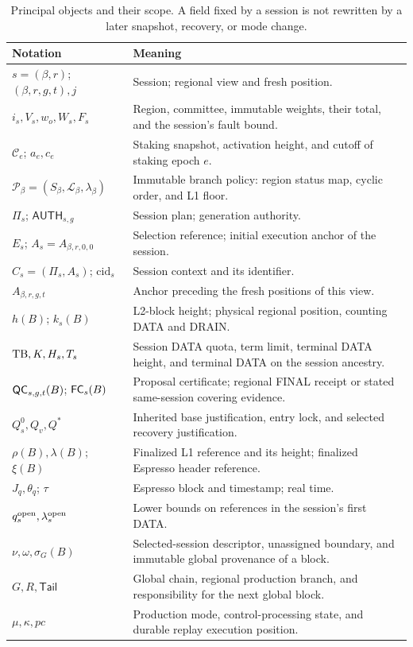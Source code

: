 \begin{table}[htbp]
\centering\small
\caption{Principal objects and their scope. A field fixed by a session is
not rewritten by a later snapshot, recovery, or mode change.}
\label{tab:notation}
\begin{tabularx}{\linewidth}{@{}P{.31\linewidth}Y@{}}
\toprule
Notation & Meaning\\\midrule
$s=(\beta,r)$; $(\beta,r,g,t),j$ & Session; regional view and fresh position.\\
$i_s,V_s,w_o,W_s,F_s$ & Region, committee, immutable weights, their total,
and the session's fault bound.\\
$\mathcal C_e$; $a_e,c_e$ & Staking snapshot, activation height, and cutoff
of staking epoch $e$.\\
$\mathcal P_\beta=(S_\beta,\mathcal L_\beta,\lambda_\beta)$ & Immutable
branch policy: region status map, cyclic order, and L1 floor.\\
$\Pi_s$; $\mathsf{AUTH}_{s,g}$ & Session plan; generation authority.\\
$E_s$; $A_s=A_{\beta,r,0,0}$ & Selection reference; initial execution
anchor of the session.\\
$C_s=(\Pi_s,A_s)$; $\mathrm{cid}_s$ & Session context and its identifier.\\
$A_{\beta,r,g,t}$ & Anchor preceding the fresh positions of this view.\\
$h(B)$; $k_s(B)$ & L2-block height; physical regional position, counting
DATA and DRAIN.\\
$\mathrm{TB},K,H_s,T_s$ & Session DATA quota, term limit, terminal DATA height,
and terminal DATA on the session ancestry.\\
$\mathsf{QC}_{s,g,t}(B)$; $\mathsf{FC}_s(B)$ & Proposal certificate; regional FINAL
receipt or stated same-session covering evidence.\\
$Q_s^0,Q_v,Q^*$ & Inherited base justification, entry lock, and selected
recovery justification.\\
$\rho(B),\lambda(B)$; $\xi(B)$ & Finalized L1 reference and its height;
finalized Espresso header reference.\\
$J_q,\theta_q$; $\tau$ & Espresso block and timestamp; real time.\\
$q_s^{\rm open},\lambda_s^{\rm open}$ & Lower bounds on references in
the session's first DATA.\\
$\nu,\omega,\sigma_G(B)$ & Selected-session descriptor, unassigned
boundary, and immutable global provenance of a block.\\
$G,R,\mathsf{Tail}$ & Global chain, regional production branch, and
responsibility for the next global block.\\
$\mu,\kappa,pc$ & Production mode, control-processing state, and durable
replay execution position.\\
\bottomrule
\end{tabularx}
\end{table}

